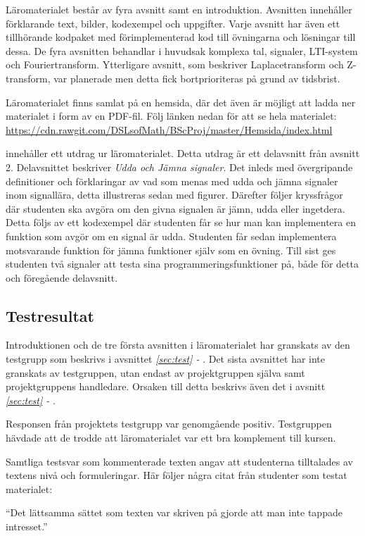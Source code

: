 \documentclass[12pt,a4paper,twoside,openright]{article}
\begin{document}
Läromaterialet består av fyra avsnitt samt en introduktion. Avsnitten
innehåller förklarande text, bilder, kodexempel och uppgifter. Varje
avsnitt har även ett tillhörande kodpaket med förimplementerad kod
till övningarna och lösningar till dessa. De fyra avsnitten behandlar
i huvudsak komplexa tal, signaler, LTI-system och Fouriertransform.
Ytterligare avsnitt, som beskriver Laplacetransform och Z-transform,
var planerade men detta fick bortprioriteras på grund av tidsbrist.

Läromaterialet finns samlat på en hemsida, där det även är möjligt att
ladda ner materialet i form av en PDF-fil. Följ länken nedan för att
se hela materialet:
\url{https://cdn.rawgit.com/DSLsofMath/BScProj/master/Hemsida/index.html}

 innehåller ett utdrag ur läromaterialet. Detta utdrag
är ett delavsnitt från avsnitt 2. Delavsnittet beskriver \textit{Udda
  och Jämna signaler}. Det inleds med övergripande definitioner och
förklaringar av vad som menas med udda och jämna signaler inom
signallära, detta illustreras sedan med figurer. Därefter följer
kryssfrågor där studenten ska avgöra om den givna signalen är jämn,
udda eller ingetdera. Detta följs av ett kodexempel där studenten får
se hur man kan implementera en funktion som avgör om en signal är
udda. Studenten får sedan implementera motsvarande funktion för jämna
funktioner själv som en övning. Till sist ges studenten två signaler
att testa sina programmeringsfunktioner på, både för detta och
föregående delavsnitt.


\subsection{Testresultat}
\label{sec:testResultat}
Introduktionen och de tre första avsnitten i läromaterialet har
granskats av den testgrupp som beskrivs i avsnittet
\textit{\ref{sec:test} - }. Det sista avsnittet har
inte granskats av testgruppen, utan endast av projektgruppen själva
samt projektgruppens handledare. Orsaken till detta beskrivs även det
i avsnitt \textit{\ref{sec:test} - }.

Responsen från projektets testgrupp var genomgående
positiv. Testgruppen hävdade att de trodde att läromaterialet var ett
bra komplement till kursen.

Samtliga testsvar som kommenterade texten angav att studenterna
tilltalades av textens nivå och formuleringar. Här följer några citat
från studenter som testat materialet:
\begin{displayquote}
  ``Det lättsamma sättet som texten var skriven på gjorde att man
  inte tappade intresset.''
\end{displayquote}
\end{document}
